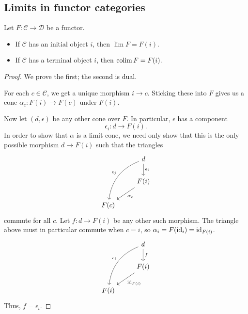\documentclass[main.tex]{subfiles}
\begin{document}
\subsection{Limits in functor categories}
\label{ssc:limits_in_functor_categories}

\begin{theorem}
  \label{thm:limit_over_category_with_initial_object_is_that}
  Let $F\colon \mathcal{C} \to \mathcal{D}$ be a functor.

  \begin{itemize}
    \item If $\mathcal{C}$ has an initial object $i$, then $\lim F = F(i)$.

    \item If $\mathcal{C}$ has a terminal object $i$, then $\operatorname*{colim} F = F(i)$.
  \end{itemize}
\end{theorem}
\begin{proof}
  We prove the first; the second is dual.

  For each $c \in \mathcal{C}$, we get a unique morphism $i \to c$. Sticking these into $F$ gives us a cone $\alpha_{c}\colon F(i) \to F(c)$ under $F(i)$.

  Now let $(d, \epsilon)$ be any other cone over $F$. In particular, $\epsilon$ has a component
  \begin{equation*}
    \epsilon_{i}\colon d \to F(i).
  \end{equation*}
  In order to show that $\alpha$ is a limit cone, we need only show that this is the only possible morphism $d \to F(i)$ such that the triangles
  \begin{equation*}
    \begin{tikzcd}
      & d
      \arrow[ddl, bend right, swap, "\epsilon_{j}"]
      \arrow[d, "\epsilon_{i}"]
      \\
      & F(i)
      \arrow[dl, "\alpha_{c}"]
      \\
      F(c)
    \end{tikzcd}
  \end{equation*}
  commute for all $c$. Let $f\colon d \to F(i)$ be any other such morphism. The triangle above must in particular commute when $c = i$, so $\alpha_{i} = F(\mathrm{id}_{i}) = \mathrm{id}_{F(i)}$.
  \begin{equation*}
    \begin{tikzcd}
      & d
      \arrow[ddl, bend right, swap, "\epsilon_{i}"]
      \arrow[d, "f"]
      \\
      & F(i)
      \arrow[dl, "\id_{F(i)}"]
      \\
      F(i)
    \end{tikzcd}
  \end{equation*}
  Thus, $f = \epsilon_{i}$.
\end{proof}
\end{document}

